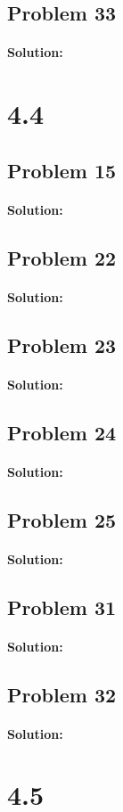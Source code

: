 \documentclass[11pt, notitlepage]{report}
\newenvironment{solution}{\paragraph{Solution:}}{\hfill}
\begin{document}
\subsection{Problem 33}
\begin{solution}
\end{solution}
\section{4.4}
\subsection{Problem 15}
\begin{solution}
\end{solution}
\subsection{Problem 22}
\begin{solution}
\end{solution}
\subsection{Problem 23}
\begin{solution}
\end{solution}
\subsection{Problem 24}
\begin{solution}
\end{solution}
\subsection{Problem 25}
\begin{solution}
\end{solution}
\subsection{Problem 31}
\begin{solution}
\end{solution}
\subsection{Problem 32}
\begin{solution}
\end{solution}
\section{4.5}
\end{document}

